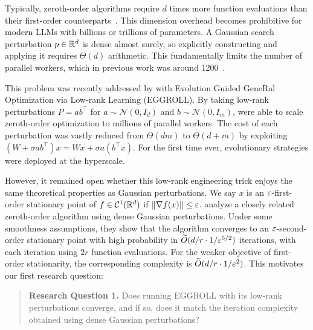 Typically, zeroth-order algorithms require $d$ times more function evaluations than their first-order counterparts~\citep{nesterov2017random}. This dimension overhead becomes prohibitive for modern LLMs with billions or trillions of parameters. A Gaussian search perturbation $p \in \mathbb{R}^d$ is dense almost surely, so explicitly constructing and applying it requires $\Theta(d)$ arithmetic. This fundamentally limits the number of parallel workers, which in previous work was around 1200~\citep{salimans2017evolution}.

This problem was recently addressed by \citet{sarkar2025evolution} with Evolution Guided GeneRal Optimization via Low-rank Learning (EGGROLL). By taking low-rank perturbations $P=ab^\top$ for $a \sim \mathcal N(0,I_d)$ and $b \sim \mathcal N(0, I_m)$, \citet{sarkar2025evolution} were able to scale zeroth-order optimization to millions of parallel workers. The cost of each perturbation was vastly reduced from $\Theta(dm)$ to $\Theta(d+m)$ by exploiting $(W + \sigma ab^\top)x = Wx + \sigma a(b^\top x)$. For the first time ever, evolutionary strategies were deployed at the hyperscale.

However, it remained open whether this low-rank engineering trick enjoys the same theoretical properties as Gaussian perturbations. We say $x$ is an $\varepsilon$-first-order stationary point of $f \in \mathcal C^1(\mathbb{R}^d)$ if $\left\lVert \nabla f(x) \right\rVert \leq \varepsilon$. \citet{ren2023escaping} analyze a closely related zeroth-order algorithm using dense Gaussian perturbations. Under some smoothness assumptions, they show that the algorithm converges to an $\varepsilon$-second-order stationary point with high probability in $\widetilde{O}(d/r \cdot 1/\varepsilon^{5/2})$ iterations, with each iteration using $2r$ function evaluations. For the weaker objective of first-order stationarity, the corresponding complexity is $\widetilde{O}(d/r \cdot 1/\varepsilon^2)$. This motivates our first research question:

\begin{quote}
    \textbf{Research Question 1.}
    Does running EGGROLL with its low-rank perturbations converge, and if so, does it match the iteration complexity obtained using dense Gaussian perturbations? 
\end{quote}

